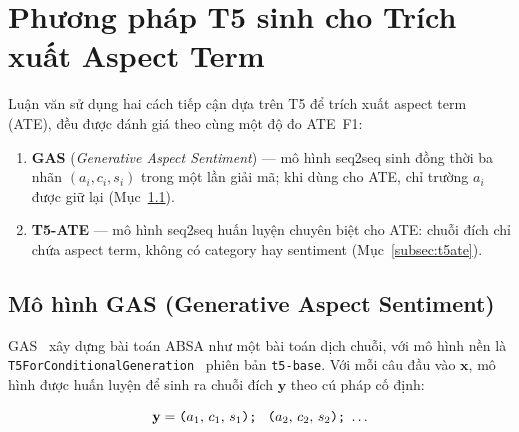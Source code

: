 
\section{Phương pháp T5 sinh cho Trích xuất Aspect Term}
\label{sec:ate}

Luận văn sử dụng hai cách tiếp cận dựa trên T5 để trích xuất aspect
term (ATE), đều được đánh giá theo cùng một độ đo ATE~F1:

\begin{enumerate}
  \item \textbf{GAS} (\textit{Generative Aspect Sentiment}) —
    mô hình seq2seq sinh đồng thời ba nhãn
    $(a_i, c_i, s_i)$ trong một lần giải mã; khi dùng cho ATE, chỉ
    trường $a_i$ được giữ lại
    (Mục~\ref{subsec:gas_full}).

  \item \textbf{T5-ATE} — mô hình seq2seq huấn luyện chuyên biệt cho
    ATE: chuỗi đích chỉ chứa aspect term, không có category hay
    sentiment (Mục~\ref{subsec:t5ate}).
\end{enumerate}

\subsection{Mô hình GAS (Generative Aspect Sentiment)}
\label{subsec:gas_full}

GAS~\cite{zhang2021gas} xây dựng bài toán ABSA như một bài toán dịch
chuỗi, với mô hình nền là
\texttt{T5ForConditionalGeneration}~\cite{raffel2020t5} phiên bản
\texttt{t5-base}.  Với mỗi câu đầu vào $\mathbf{x}$, mô hình được
huấn luyện để sinh ra chuỗi đích $\mathbf{y}$ theo cú pháp cố định:

\begin{equation}
  \mathbf{y} = \texttt{(}a_1,\, c_1,\, s_1\texttt{);\;
               (}a_2,\, c_2,\, s_2\texttt{);\;} \dots
  \label{eq:gas_format}
\end{equation}


